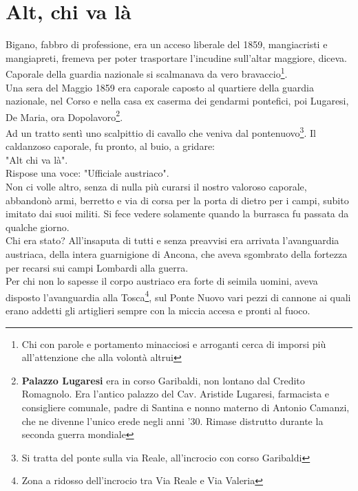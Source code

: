 
\chapter{Alt, chi va là}
Bigano, fabbro di professione, era un acceso liberale del 1859, mangiacristi e mangiapreti, fremeva per poter trasportare l'incudine sull'altar maggiore, diceva. Caporale della guardia nazionale si scalmanava da vero bravaccio\footnote{Chi con parole e portamento minacciosi e arroganti cerca di imporsi più all'attenzione che alla volontà altrui}.\\
\indent Una sera del Maggio 1859 era caporale caposto al quartiere della guardia nazionale, nel Corso e nella casa ex caserma dei gendarmi pontefici, poi Lugaresi, De Maria, ora Dopolavoro\footnote{\textbf{Palazzo Lugaresi} era in corso Garibaldi, non lontano dal Credito Romagnolo. Era l'antico palazzo del Cav. Aristide Lugaresi, farmacista e consigliere comunale, padre di Santina e nonno materno di Antonio Camanzi, che ne divenne l'unico erede negli anni '30. Rimase distrutto durante la seconda guerra mondiale}.\\Ad un tratto sentì uno scalpittio di cavallo che veniva dal pontenuovo\footnote{Si tratta del ponte sulla via Reale, all'incrocio con corso Garibaldi}. Il caldanzoso caporale, fu pronto, al buio, a gridare:\\
\indent "Alt chi va là".\\
\indent Rispose una voce: "Ufficiale austriaco".\\
\indent Non ci volle altro, senza di nulla più curarsi il nostro valoroso caporale, abbandonò armi, berretto e via di corsa per la porta di dietro per i campi, subito imitato dai suoi militi. Si fece vedere solamente quando la burrasca fu passata da qualche giorno.\\
\indent Chi era stato? All'insaputa di tutti e senza preavvisi era arrivata l'avanguardia austriaca, della intera guarnigione di Ancona, che aveva sgombrato della fortezza per recarsi sui campi Lombardi alla guerra.\\
\indent Per chi non lo sapesse il corpo austriaco era forte di seimila uomini, aveva disposto l'avanguardia alla Tosca\footnote{Zona a ridosso dell'incrocio tra Via Reale e Via Valeria}, sul Ponte Nuovo vari pezzi di cannone ai quali erano addetti gli artiglieri sempre con la miccia accesa e pronti al fuoco.\\
